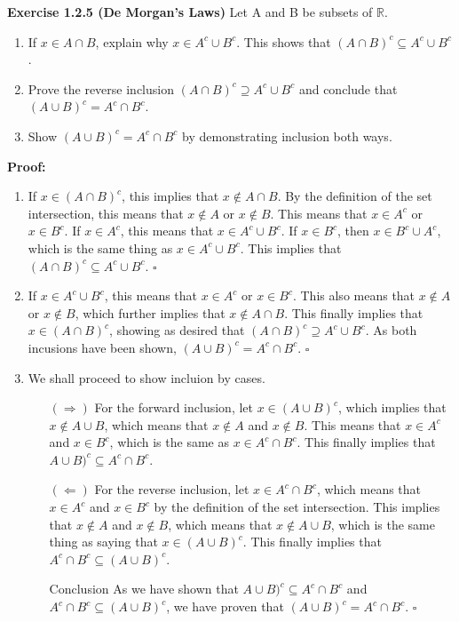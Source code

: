 \documentclass[12 pt]{article}
\newcommand{\qed}[0]{$\square$}
\begin{document}
 
\textbf{Exercise 1.2.5 (De Morgan's Laws)} Let A and B be subsets of \(\mathbb{R}\).

\begin{enumerate}
\item If \(x \in A \cap B\), explain why \(x \in A^c \cup B^c\). This shows that \((A \cap B)^c \subseteq A^c \cup B^c\).
\item Prove the reverse inclusion \((A \cap B)^c \supseteq A^c \cup B^c\) and conclude that \((A \cup B)^c = A^c \cap B^c\).
\item Show \((A \cup B)^c = A^c \cap B^c\) by demonstrating inclusion both ways.
\end{enumerate}

\vspace{5mm}
\textbf{Proof:}
\begin{enumerate}
\item If \(x \in (A \cap B)^c\), this implies that \(x \not \in A \cap B\). By the definition of the set intersection, this means that \(x \not \in A\) or \(x \not \in B\). This means that \(x \in A^c\) or \(x \in B^c\). If \(x \in A^c\), this means that \(x \in A^c \cup B^c\). If \(x \in B^c\), then \(x \in B^c \cup A^c\), which is the same thing as \(x \in  A^c \cup B^c\). This implies that \((A \cap B)^c \subseteq A^c \cup B^c \). \qed

\item If $x \in A^c \cup B^c$, this means that $x \in A^c$ or $x \in B^c$. This also means that $x \not \in  A$ or $x \not \in B$, which further implies that $x \not \in A \cap B$. This finally implies that $x \in (A \cap B)^c$, showing as desired that \((A \cap B)^c \supseteq A^c \cup B^c\). As both incusions have been shown, \((A \cup B)^c = A^c \cap B^c\). \qed

\item We shall proceed to show incluion by cases.
\begin{enumerate}
\item[\((\Rightarrow)\)] For the forward inclusion, let \(x \in (A \cup B)^c\), which implies that \(x \not \in A \cup B\), which means that \(x \not \in A\) and \(x \not \in B\). This means that \(x \in A^c\) and \(x \in B^c\), which is the same as \(x \in A^c \cap B^c\). This finally implies that \(A \cup B)^{c} \subseteq A^{c} \cap B^{c}\).

\item[\((\Leftarrow)\)] For the reverse inclusion, let \(x \in A^c \cap B^c\), which means that \(x \in A^c\) and \(x \in B^c\) by the definition of the set intersection. This implies that \(x \not \in A\) and \(x \not \in B\), which means that \(x \not \in A \cup B\), which is the same thing as saying that \(x \in (A \cup B)^c\). This finally implies that \(A^{c} \cap B^{c} \subseteq (A \cup B)^{c}\).
\item[Conclusion] As we have shown that \(A \cup B)^{c} \subseteq A^{c} \cap B^{c}\) and \(A^{c} \cap B^{c} \subseteq (A \cup B)^{c}\), we have proven that \((A \cup B)^c = A^c \cap B^c\). \qed
\end{enumerate}
\end{enumerate}
\end{document}
